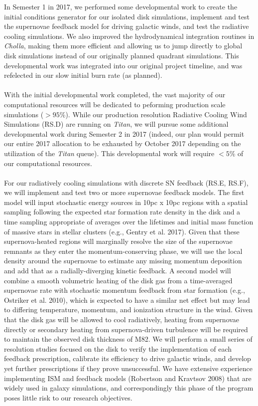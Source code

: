 \documentclass[11pt,letterpaper,english]{article}
\begin{document}
In Semester 1 in 2017, we performed some developmental work to create the initial conditions generator for our isolated
disk simulations, implement and test the supernovae feedback model for driving galactic winds, and test the radiative
cooling simulations. We also improved the hydrodynamical integration routines in \textit{Cholla}, making them more efficient
and allowing us to jump directly to global disk simulations instead of our originally planned quadrant simulations. This
developmental work was integrated into our original project timeline, and was refelected in our slow initial burn rate (as
planned). 
~\\~\\
With the initial developmental work completed, the vast majority of our computational resources will be dedicated to peforming
production scale simulations ($>95$\%). While our production resolution Radiative Cooling Wind Simulations (RS.D) are running on \textit{Titan}, we will pursue some additional developmental work during Semester 2 in 2017 (indeed, our plan would permit our entire 2017 allocation to be exhausted by October 2017 depending on the utilization of the \textit{Titan} queue). This developmental work will require $<5$\% of our computational resources.
~\\~\\
For our radiatively cooling simulations with discrete SN feedback (RS.E, RS.F), we will implement and test two or more supernovae feedback models. The first model will input stochastic energy sources in 10pc x 10pc regions with a spatial sampling following the expected star formation rate density in the disk and a time sampling appropriate of averages over the lifetimes and initial mass function of massive stars in stellar clusters (e.g., Gentry et al. 2017). Given that these supernova-heated regions will marginally resolve the size of the supernovae remnants as they enter the momentum-conserving phase, we will use the local density around the supernovae to estimate any missing momentum deposition and add that as a radially-diverging kinetic feedback. A second model will combine a smooth volumetric heating of the disk gas from a time-averaged supernovae rate with stochastic momentum feedback from star formation (e.g., Ostriker et al. 2010), which is expected to have a similar net effect but may lead to differing temperature, momentum, and ionization structure in the wind.
Given that the disk gas will be allowed to cool radiatively, heating from supernovae directly or secondary heating from supernova-driven turbulence will be required to maintain the observed disk thickness of M82. We will perform a small series of resolution studies focused on the disk to verify the implementation of each feedback prescription, calibrate its efficiency to drive galactic winds, and develop yet further prescriptions if they prove unsuccessful. We have extensive experience implementing ISM and feedback models (Robertson and Kravtsov 2008) that are widely used in galaxy simulations, and correspondingly this phase of the program poses little risk to our research objectives. 
\end{document}
